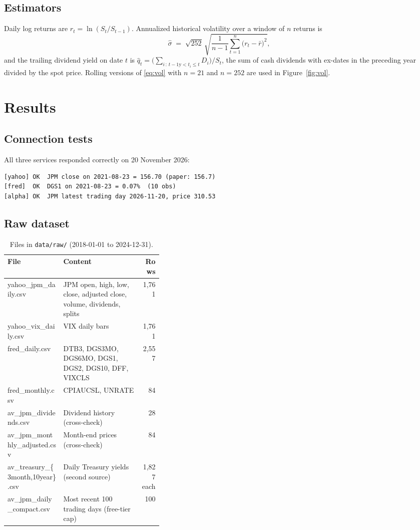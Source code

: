 \documentclass[11pt]{article}
\newcommand{\code}[1]{\texttt{#1}}
\begin{document}
\subsection{Estimators}
Daily log returns are $r_t = \ln(S_t/S_{t-1})$. Annualized historical volatility over a window of $n$ returns is
\begin{equation}
  \hat\sigma \;=\; \sqrt{252}\,\sqrt{\frac{1}{n-1}\sum_{t=1}^{n}\bigl(r_t-\bar r\bigr)^2},
  \label{eq:vol}
\end{equation}
and the trailing dividend yield on date $t$ is $\hat q_t = \bigl(\sum_{i\,:\,t-1\text{y} < t_i \le t} D_i\bigr)/S_t$,
the sum of cash dividends with ex-dates in the preceding year divided by the spot price. Rolling versions of
\eqref{eq:vol} with $n=21$ and $n=252$ are used in Figure~\ref{fig:vol}.

\section{Results}
\subsection{Connection tests}
All three services responded correctly on 20 November 2026:
\begin{lstlisting}
[yahoo] OK  JPM close on 2021-08-23 = 156.70 (paper: 156.7)
[fred]  OK  DGS1 on 2021-08-23 = 0.07%  (10 obs)
[alpha] OK  JPM latest trading day 2026-11-20, price 310.53
\end{lstlisting}

\subsection{Raw dataset}
\begin{table}[H]
\centering\small
\caption{Files in \code{data/raw/} (2018-01-01 to 2024-12-31).}
\label{tab:files}
\begin{tabularx}{\linewidth}{@{}>{\ttfamily}p{0.36\linewidth}Lr@{}}
\toprule
\normalfont File & Content & Rows \\
\midrule
yahoo\_jpm\_daily.csv & JPM open, high, low, close, adjusted close, volume, dividends, splits & 1,761 \\
yahoo\_vix\_daily.csv & VIX daily bars & 1,761 \\
fred\_daily.csv & DTB3, DGS3MO, DGS6MO, DGS1, DGS2, DGS10, DFF, VIXCLS & 2,557 \\
fred\_monthly.csv & CPIAUCSL, UNRATE & 84 \\
av\_jpm\_dividends.csv & Dividend history (cross-check) & 28 \\
av\_jpm\_monthly\_adjusted.csv & Month-end prices (cross-check) & 84 \\
av\_treasury\_\{3month,10year\}.csv & Daily Treasury yields (second source) & 1,827 each \\
av\_jpm\_daily\_compact.csv & Most recent 100 trading days (free-tier cap) & 100 \\
\bottomrule
\end{tabularx}
\end{table}
\end{document}

